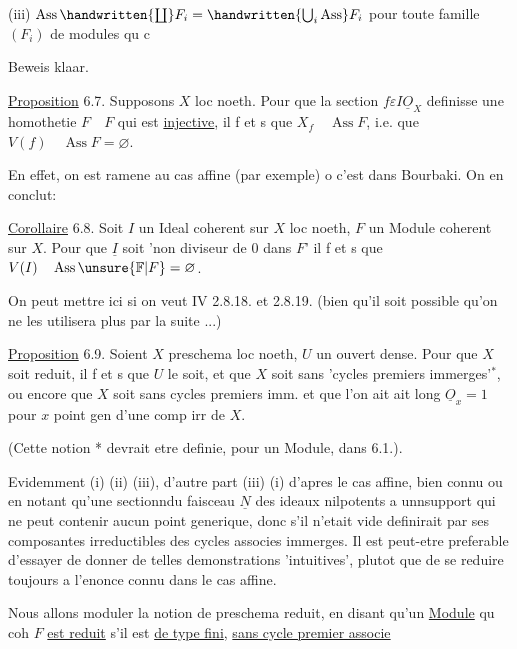 (iii) $\operatorname{Ass}\handwritten{\coprod} F_i=\handwritten{\bigcup_i\operatorname{Ass}}F_i$ \qquad pour toute famille $(F_i)$ de modules qu c

Beweis klaar.

\uline{Proposition} 6.7. \quad Supposons $X$ loc noeth. Pour que la section $f\varepsilon I\underline O_X$ definisse une homothetie $F\quad F$ qui est \uline{injective}, il f et s que $X_f\quad\operatorname{Ass}F$, i.e. que $V(f)\quad\operatorname{Ass}F=\varnothing$.

En effet, on est ramene au cas affine (par exemple) o c'est dans Bourbaki. On en conclut:

\uline{Corollaire} 6.8. \quad Soit $I$ un Ideal coherent sur $X$ loc noeth, $F$ un Module coherent sur $X$. Pour que $\underline I$ soit 'non diviseur de 0 dans $F$' il f et s que $V(I)\quad\operatorname{Ass}\unsure{\mathbb F|F}=\varnothing$.

On peut mettre ici si on veut IV 2.8.18. et 2.8.19. (bien qu'il soit possible qu'on ne les utilisera plus par la suite ...)

\uline{Proposition} 6.9. \quad Soient $X$ preschema loc noeth, $U$ un ouvert dense. Pour que $X$ soit reduit, il f et s que $U$ le soit, et que $X$ soit sans 'cycles premiers immerges'$^*$, ou encore que $X$ soit sans cycles premiers imm. et que l'on ait \quad ait long $\underline O_x=1$ pour $x$ point gen d'une comp irr de $X$.

(Cette notion * devrait etre definie, pour un Module, dans 6.1.).

Evidemment (i) \quad (ii) \quad (iii), d'autre part (iii) \quad (i)  d'apres le cas affine, bien connu  ou en notant qu'une sectionndu faisceau $\underline N$ des ideaux nilpotents a unnsupport qui ne peut contenir aucun point generique, donc s'il n'etait vide definirait par ses composantes irreductibles des cycles associes immerges. Il est peut-etre preferable d'essayer de donner  de telles demonstrations 'intuitives', plutot que de se reduire toujours a l'enonce connu dans le cas affine.

Nous allons moduler la notion de preschema reduit, en disant qu'un \uline{Module} qu coh $F$ \uline{est reduit} s'il est \uline{de type fini}, \uline{sans cycle premier associe}


